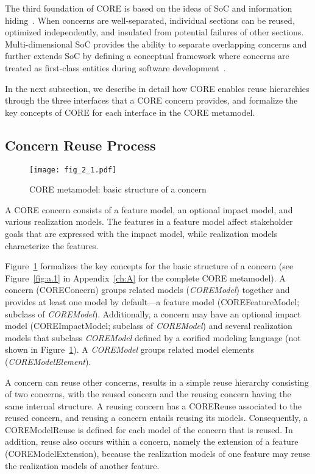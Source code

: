 The third foundation of CORE is based on the ideas of SoC and information hiding~\cite{dijkstra1976discipline, parnas1972criteria}. When concerns are well-separated, individual sections can be reused, optimized independently, and insulated from potential failures of other sections. Multi-dimensional SoC provides the ability to separate overlapping concerns and further extends SoC by defining a conceptual framework where concerns are treated as first-class entities during software development~\cite{tarr1999n}.

In the next subsection, we describe in detail how CORE enables reuse hierarchies through the three interfaces that a CORE concern provides, and formalize the key concepts of CORE for each interface in the CORE metamodel.

\subsection{Concern Reuse Process}

\begin{figure}
	\centering
	\texttt{[image: fig\_2\_1.pdf]}
	\caption{CORE metamodel: basic structure of a concern}
	\label{fig:2.1}
\end{figure}

A CORE concern consists of a feature model, an optional impact model, and various realization models. The features in a feature model affect stakeholder goals that are expressed with the impact model, while realization models characterize the features.

Figure~\ref{fig:2.1} formalizes the key concepts for the basic structure of a concern (see Figure~\ref{fig:a.1} in Appendix~\ref{ch:A} for the complete CORE metamodel). A concern ({\cls COREConcern}) groups related models (\textit{\cls COREModel}) together and provides at least one model by default---a feature model ({\cls COREFeatureModel}; subclass of \textit{\cls COREModel}). Additionally, a concern may have an optional impact model ({\cls COREImpactModel}; subclass of \textit{\cls COREModel}) and several realization models that subclass \textit{\cls COREModel} defined by a corified modeling language (not shown in Figure~\ref{fig:2.1}). A \textit{\cls COREModel} groups related model elements (\textit{\cls COREModelElement}).

A concern can reuse other concerns,  results in a simple reuse hierarchy consisting of two concerns, with the reused concern and the reusing concern having the same internal structure. A reusing concern has a {\cls COREReuse} associated to the reused concern, and reusing a concern entails reusing its models. Consequently, a {\cls COREModelReuse} is defined for each model of the concern that is reused. In addition, reuse also occurs within a concern, namely the extension of a feature ({\cls COREModelExtension}), because the realization models of one feature may reuse the realization models of another feature.

